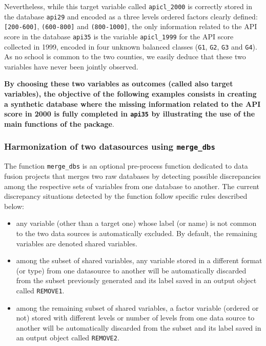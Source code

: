 Nevertheless, while this target variable called \texttt{apicl\_2000} is correctly stored in the database \texttt{api29} and encoded as a three levels ordered factors clearly defined: \texttt{{[}200-600{]}}, \texttt{(600-800{]}} and \texttt{(800-1000{]}}, the only information related to the API score in the database \texttt{api35} is the variable \texttt{apicl\_1999} for the API score collected in 1999, encoded in four unknown balanced classes (\texttt{G1}, \texttt{G2}, \texttt{G3} and \texttt{G4}). As no school is common to the two counties, we easily deduce that these two variables have never been jointly observed.

\textbf{By choosing these two variables as outcomes (called also target variables), the objective of the following examples consists in creating a synthetic database where the missing information related to the API score in 2000 is fully completed in \texttt{api35} by illustrating the use of the main functions of the package}.

\hypertarget{harmonization-of-two-datasources-using-merge_dbs}{%
\subsubsection{\texorpdfstring{Harmonization of two datasources using \texttt{merge\_dbs}}{Harmonization of two datasources using merge\_dbs}}\label{harmonization-of-two-datasources-using-merge_dbs}}

The function \texttt{merge\_dbs} is an optional pre-process function dedicated to data fusion projects that merges two
raw databases by detecting possible discrepancies among the respective sets of variables from one database to
another. The current discrepancy situations detected by the function follow specific rules described below:

\begin{itemize}
\tightlist
\item
  any variable (other than a target one) whose label (or name) is not common to the two data sources is automatically excluded. By default, the remaining variables are denoted shared variables.
\item
  among the subset of shared variables, any variable stored in a different format (or type) from one datasource to another will be automatically discarded from the subset previously generated and its label saved in an output object called \texttt{REMOVE1}.
\item
  among the remaining subset of shared variables, a factor variable (ordered or not) stored with different levels or number of levels from one data source to another will be automatically discarded from the subset and its label saved in an output object called \texttt{REMOVE2}.
\end{itemize}

